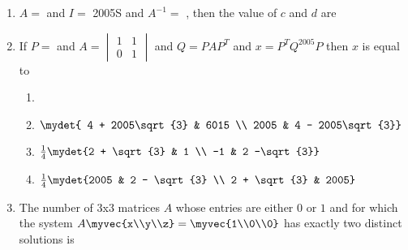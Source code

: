 \begin{enumerate}
    \item $A=$  and $I=$  \hfill{2005S}
        and $A^{-1} = $ , then the value of $c$ and $d$ are \hfill{}
        \begin{enumerate}
        \end{enumerate}


    \item If $P=$ 
        and $A = \begin{vmatrix} 1& 1 \\ 0 & 1\end{vmatrix}$ and $Q = PAP^T$ and $x=P^{T}Q^{2005}P$ then $x$ is equal to 


            \begin{enumerate}
                \item {}
                \item $\mydet{ 4 + 2005\sqrt{3} & 6015 \\ 2005 & 4 - 2005\sqrt{3}}$
                \item $\frac{1}{4}\mydet{2 + \sqrt{3} & 1 \\ -1 & 2 -\sqrt{3}}$
                \item $\frac{1}{4}\mydet{2005 & 2 - \sqrt{3} \\ 2 + \sqrt{3} & 2005}$
            \end{enumerate}		
            \item The number of 3x3 matrices $A$ whose entries are either $0$ or $1$ and for which the system $A\myvec{x\\y\\z}=\myvec{1\\0\\0}$ has exactly two distinct solutions is \hfill{}


\end{enumerate}
